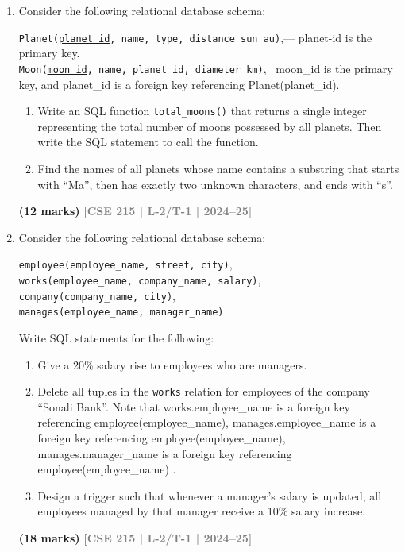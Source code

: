 \documentclass[12pt]{article}
\newcommand{\yr}[1]{\hfill\textcolor{gray}{\small\textbf{[#1]}}}
\newcommand{\mk}[1]{\textcolor{orange!70!black}{\small\textbf{(#1 marks)}}}
\begin{document}
\begin{enumerate}

\item Consider the following relational database schema:
\begin{center}
\texttt{Planet(\underline{planet\_id}, name, type, distance\_sun\_au)},\quad --- planet-id is the primary key.
\\ \texttt{Moon(\underline{moon\_id}, name, planet\_id, diameter\_km)}, \ moon_id is the primary key, and planet_id is a foreign key referencing Planet(planet_id). 
\end{center}
\begin{enumerate}
  \item Write an SQL function \texttt{total\_moons()} that returns a single integer representing the total number of moons possessed by all planets. Then write the SQL statement to call the function.
  \item Find the names of all planets whose name contains a substring that starts with ``Ma'', then has exactly two unknown characters, and ends with ``s''.
\end{enumerate}
\mk{12} \yr{CSE 215 | L-2/T-1 | 2024--25}


\item Consider the following relational database schema:
\begin{center}
\texttt{employee(employee\_name, street, city)},\quad \\\texttt{works(employee\_name, company\_name, salary)},\\
\texttt{company(company\_name, city)},\quad \\\texttt{manages(employee\_name, manager\_name)}
\end{center}
Write SQL statements for the following:
\begin{enumerate}
  \item Give a 20\% salary rise to employees who are managers.
  \item Delete all tuples in the \texttt{works} relation for employees of the company ``Sonali Bank''. 
  Note that works.employee_name is a foreign key referencing employee(employee_name),
 manages.employee_name is a foreign key referencing employee(employee_name),
 manages.manager_name is a foreign key referencing employee(employee_name) .
  \item Design a trigger such that whenever a manager's salary is updated, all employees managed by that manager receive a 10\% salary increase.
\end{enumerate}
\mk{18} \yr{CSE 215 | L-2/T-1 | 2024--25}




\end{enumerate}
\end{document}

